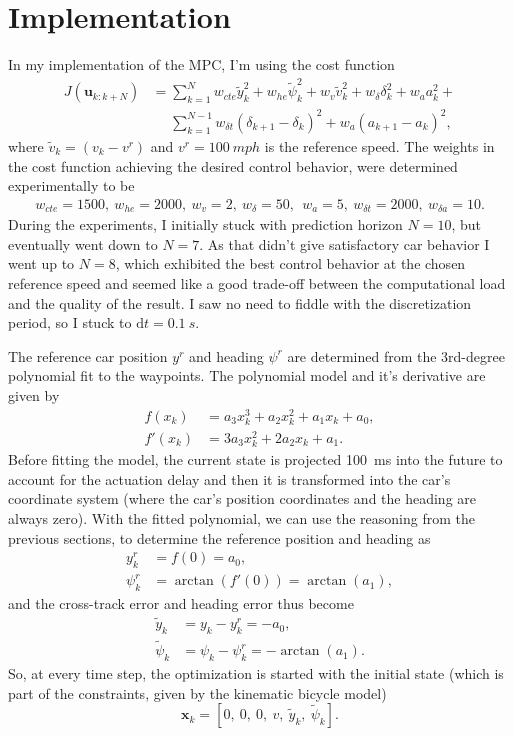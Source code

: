 \documentclass[a4paper]{article}
\begin{document}
\section{Implementation}
In my implementation of the MPC, I'm using the cost function 
\begin{align}\label{eq:mpc_my_cost}
	J(\bm{u}_{k:k+N}) 
	&= \sum_{k=1}^{N} w_{cte}\tilde{y}_k^2 + w_{he}\tilde{\psi}_k^2 + w_{v}\tilde{v}_k^2 + w_{\delta}\delta_k^2  + w_{a}a_k^2 + \nonumber \\
	&\mathrel{\phantom{=}} \sum_{k=1}^{N-1} w_{\delta t}(\delta_{k+1} - \delta_k)^2 + w_a(a_{k+1} - a_k)^2,
\end{align}
where $ \tilde{v}_k = (v_k - v^r) $ and $ v^r = \SI{100}{mph} $ is the reference speed.
The weights in the cost function achieving the desired control behavior, were determined experimentally to be
\begin{align}\label{key}
w_{cte} = 1500,\ w_{he} = 2000,\  w_{v} = 2,\ w_{\delta} = 50,\ \ w_{a} = 5,\ w_{\delta t} = 2000,\ w_{\delta a} = 10.
\end{align}
During the experiments, I initially stuck with prediction horizon $ N = 10 $, but eventually went down to $ N = 7 $.
As that didn't give satisfactory car behavior I went up to $ N = 8 $, which exhibited the best control behavior at the chosen reference speed and seemed like a good trade-off between the computational load and the quality of the result.
I saw no need to fiddle with the discretization period, so I stuck to $ \mathrm{d}t = \SI{0.1}{s} $.

The reference car position $ y^r $ and heading $ \psi^r $ are determined from the 3rd-degree polynomial fit to the waypoints.
The polynomial model and it's derivative are given by
\begin{align}\label{eq:trajectory_polynomial}
	f(x_k) 	&= a_3x_k^3 + a_2x_k^2 + a_1x_k + a_0, \\
	f'(x_k) &= 3a_3x_k^2 + 2a_2x_k + a_1.
\end{align}
Before fitting the model, the current state is projected \SI{100}{ms} into the future to account for the actuation delay and then it is transformed into the car's coordinate system (where the car's position coordinates and the heading are always zero).
With the fitted polynomial, we can use the reasoning from the previous sections, to determine the reference position and heading as
\begin{align}\label{}
y^r_k 		&= f(0) = a_0, \\
\psi^r_k	&= \arctan(f'(0)) = \arctan(a_1),
\end{align}
and the cross-track error and heading error thus become
\begin{align}\label{}
	\tilde{y}_k 	&= y_k - y^r_k = -a_0,	\\
	\tilde{\psi}_k 	&= \psi_k - \psi^r_k = -\arctan(a_1).
\end{align}
So, at every time step, the optimization is started with the initial state (which is part of the constraints, given by the kinematic bicycle model)
\begin{equation}\label{}
	\bm{x}_k = \left[ 0,\ 0,\ 0,\ v,\ \tilde{y}_k,\ \tilde{\psi}_k \right].
\end{equation}





\end{document}
